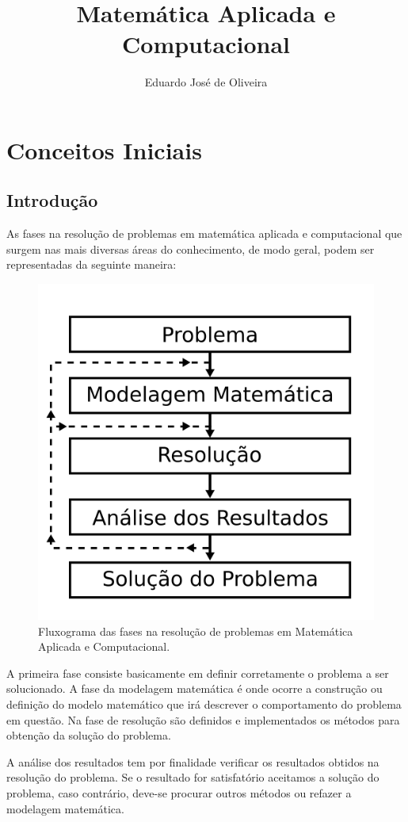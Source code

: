 \documentclass[12pt,a4paper]{book}
\title{Matemática Aplicada e Computacional}
\author{Eduardo José de Oliveira}
\numberwithin{example}{chapter}
\numberwithin{remark}{chapter}
\begin{document}
%
%
%
\chapter{Conceitos Iniciais}

\section{Introdução}

As fases na resolução de problemas em matemática aplicada e computacional que surgem nas mais diversas áreas do conhecimento, de modo geral, podem ser representadas da seguinte maneira:

\begin{figure}[h]
	\centering
	\includegraphics[scale=0.2]{figuras/figura_001}
	\caption{Fluxograma das fases na resolução de problemas em Matemática Aplicada e Computacional.}
\end{figure}

A primeira fase consiste basicamente em definir corretamente o problema a ser solucionado. A fase da modelagem matemática é onde ocorre a construção ou definição do modelo matemático que irá descrever o comportamento do problema em questão. Na fase de resolução são definidos e implementados os métodos para obtenção da solução do problema.

A análise dos resultados tem por finalidade verificar os resultados obtidos na resolução do problema. Se o resultado for satisfatório aceitamos a solução do problema, caso contrário, deve-se procurar outros métodos ou refazer a modelagem matemática.
\end{document}
